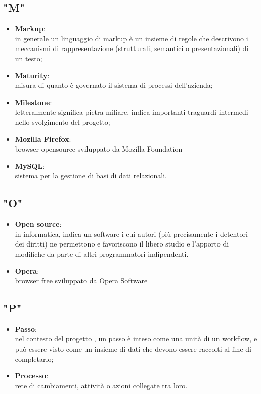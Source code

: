 \subsection{"M"}
\begin{itemize}
\item \textbf{Markup}:\\ in generale un linguaggio di markup è un insieme di regole che descrivono i meccanismi di rappresentazione (strutturali, semantici o presentazionali) di un testo;
\item \textbf{Maturity}:\\ misura di quanto è governato il sistema di processi dell'azienda;
\item \textbf{Milestone}:\\ letteralmente significa pietra miliare, indica importanti traguardi intermedi nello svolgimento del progetto;
\item \textbf{Mozilla Firefox}:\\ browser opensource sviluppato da Mozilla Foundation
\item \textbf{MySQL}:\\ sistema per la gestione di basi di dati relazionali.
\end{itemize}

\subsection{"O"}
\begin{itemize}
\item \textbf{Open source}:\\ in informatica, indica un software i cui autori (più precisamente i detentori dei diritti) ne permettono e favoriscono il libero studio e l'apporto di modifiche da parte di altri programmatori indipendenti.
\item \textbf{Opera}:\\ browser free sviluppato da Opera Software
\end{itemize}

\subsection{"P"}
\begin{itemize}
\item \textbf{Passo}:\\ nel contesto del progetto \progetto, un passo è inteso come una unità di un workflow, e può essere visto come un insieme di dati che devono essere raccolti al fine di completarlo;
\item \textbf{Processo}:\\ rete di cambiamenti, attività o azioni collegate tra loro.
\end{itemize}
